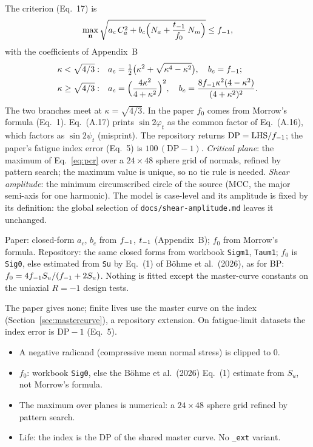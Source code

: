  The criterion (Eq.~17) is
\begin{equation}
\max_{\mathbf n}\sqrt{a_c\,C_a^2 + b_c\Bigl(N_a + \frac{t_{-1}}{f_0}\,N_m\Bigr)} \le f_{-1} ,
\label{eq:pcr}
\end{equation}
with the coefficients of Appendix~B
\begin{equation}
\begin{aligned}
\kappa<\sqrt{4/3}:&\quad a_c=\tfrac12\bigl(\kappa^2+\sqrt{\kappa^4-\kappa^2}\bigr),\quad b_c=f_{-1};\\
\kappa\ge\sqrt{4/3}:&\quad a_c=\Bigl(\frac{4\kappa^2}{4+\kappa^2}\Bigr)^2,\quad
b_c=\frac{8f_{-1}\kappa^2(4-\kappa^2)}{(4+\kappa^2)^2}.
\end{aligned}
\label{eq:pcr-coef}
\end{equation}
The two branches meet at $\kappa=\sqrt{4/3}$. In the paper $f_0$ comes from Morrow's formula (Eq.~1).
Eq.~(A.17) prints $\sin2\varphi_t$ as the common factor of Eq.~(A.16), which factors as $\sin2\psi_t$
(misprint). The repository returns $\mathrm{DP}=\mathrm{LHS}/f_{-1}$; the paper's fatigue index error
(Eq.~5) is $100\,(\mathrm{DP}-1)$. \emph{Critical plane}: the maximum of Eq.~\eqref{eq:pcr} over a
$24\times48$ sphere grid of normals, refined by pattern search; the maximum value is unique, so no tie rule is
needed. \emph{Shear amplitude}: the minimum circumscribed circle of the source (MCC, the major
semi-axis for one harmonic). The model is case-level and its amplitude is fixed by its definition:
the global selection of \texttt{docs/shear-amplitude.md} leaves it unchanged.

 Paper: closed-form $a_c$, $b_c$ from $f_{-1}$, $t_{-1}$ (Appendix~B); $f_0$
from Morrow's formula. Repository: the same closed forms from workbook \texttt{Sigm1}, \texttt{Taum1};
$f_0$ is \texttt{Sig0}, else estimated from \texttt{Su} by Eq.~(1) of B\"ohme et al.\ (2026), as for
BP: $f_0=4f_{-1} S_u/(f_{-1}+2S_u)$. Nothing is fitted except the master-curve constants on the uniaxial
$R=-1$ design tests.

 The paper gives none; finite lives use the master curve on the index
(Section~\ref{sec:mastercurve}), a repository extension. On fatigue-limit datasets the index error is
$\mathrm{DP}-1$ (Eq.~5).

\begin{itemize}
\item A negative radicand (compressive mean normal stress) is clipped to 0.
\item $f_0$: workbook \texttt{Sig0}, else the B\"ohme et al.\ (2026) Eq.~(1) estimate from $S_u$, not
  Morrow's formula.
\item The maximum over planes is numerical: a $24\times48$ sphere grid refined by pattern search.
\item Life: the index is the DP of the shared master curve. No \texttt{\_ext} variant.
\end{itemize}

